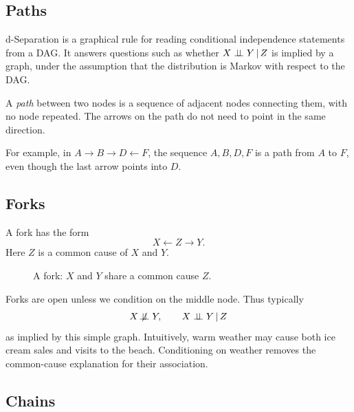 \label{lec:3-3}

\subsection{Paths}

d-Separation is a graphical rule for reading conditional independence statements
from a DAG. It answers questions such as whether $X\perp\!\!\!\perp Y\,\vert\, Z$ is implied by
a graph, under the assumption that the distribution is Markov with respect to the
DAG.

\begin{definition}[Path]
A \emph{path} between two nodes is a sequence of adjacent nodes connecting them, with no node repeated. The arrows on the path do not need to point in the same direction.
\end{definition}

For example, in $A\to B\to D\leftarrow F$, the sequence $A,B,D,F$ is a path from $A$ to $F$, even though the last arrow points into $D$.

\subsection{Forks}

A fork has the form
\[
X\leftarrow Z\to Y.
\]
Here $Z$ is a common cause of $X$ and $Y$.

\begin{figure}[H]
\centering
{}
\caption{A fork: $X$ and $Y$ share a common cause $Z$.}
\end{figure}

Forks are open unless we condition on the middle node. Thus typically
\[
X\not\!\perp\!\!\!\perp Y,
\qquad
X\perp\!\!\!\perp Y\,\vert\, Z
\]
as implied by this simple graph. Intuitively, warm weather may cause both ice cream sales and visits to the beach. Conditioning on weather removes the common-cause explanation for their association.

\subsection{Chains}

